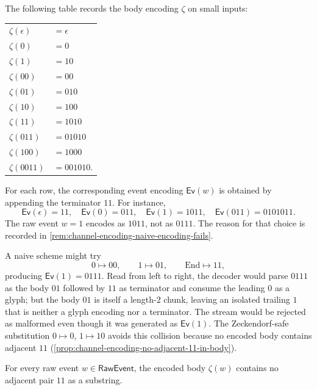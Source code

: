 \begin{example}
\label{ex:channel-encoding-sample-event-encodings}
The following table records the body encoding $\zeta$ on small inputs:
\begin{center}
\begin{tabular}{ll}
  $\zeta(\epsilon)$  & $= \epsilon$ \\
  $\zeta(0)$         & $= 0$ \\
  $\zeta(1)$         & $= 10$ \\
  $\zeta(00)$        & $= 00$ \\
  $\zeta(01)$        & $= 010$ \\
  $\zeta(10)$        & $= 100$ \\
  $\zeta(11)$        & $= 1010$ \\
  $\zeta(011)$       & $= 01010$ \\
  $\zeta(100)$       & $= 1000$ \\
  $\zeta(0011)$      & $= 001010$.
\end{tabular}
\end{center}
For each row, the corresponding event encoding $\mathsf{Ev}(w)$ is obtained by appending the terminator $11$. For instance,
$$
  \mathsf{Ev}(\epsilon) = 11,
  \quad
  \mathsf{Ev}(0) = 011,
  \quad
  \mathsf{Ev}(1) = 1011,
  \quad
  \mathsf{Ev}(011) = 0101011.
$$
The raw event $w = 1$ encodes as $1011$, not as $0111$. The reason for that choice is recorded in \autoref{rem:channel-encoding-naive-encoding-fails}.
\end{example}

\begin{remark}
\label{rem:channel-encoding-naive-encoding-fails}
A naive scheme might try
$$
  0 \mapsto 00,
  \qquad
  1 \mapsto 01,
  \qquad
  \mathrm{End} \mapsto 11,
$$
producing $\mathsf{Ev}(1) = 0111$. Read from left to right, the decoder would parse $0111$ as the body $01$ followed by $11$ as terminator and consume the leading $0$ as a glyph; but the body $01$ is itself a length-$2$ chunk, leaving an isolated trailing $1$ that is neither a glyph encoding nor a terminator. The stream would be rejected as malformed even though it was generated as $\mathsf{Ev}(1)$. The Zeckendorf-safe substitution $0 \mapsto 0$, $1 \mapsto 10$ avoids this collision because no encoded body contains adjacent $11$ (\autoref{prop:channel-encoding-no-adjacent-11-in-body}).
\end{remark}

\begin{proposition}
\label{prop:channel-encoding-no-adjacent-11-in-body}
For every raw event $w \in \mathsf{RawEvent}$, the encoded body $\zeta(w)$ contains no adjacent pair $11$ as a substring.
\end{proposition}

